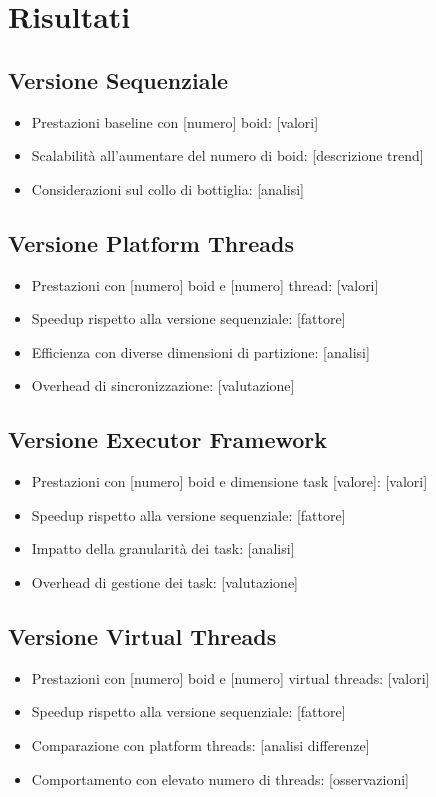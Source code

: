 \documentclass[a4paper,12pt]{report}
\begin{document}
\section{Risultati}

\subsection{Versione Sequenziale}
\begin{itemize}
    \item Prestazioni baseline con [numero] boid: [valori]
    \item Scalabilità all'aumentare del numero di boid: [descrizione trend]
    \item Considerazioni sul collo di bottiglia: [analisi]
\end{itemize}

\subsection{Versione Platform Threads}
\begin{itemize}
    \item Prestazioni con [numero] boid e [numero] thread: [valori]
    \item Speedup rispetto alla versione sequenziale: [fattore]
    \item Efficienza con diverse dimensioni di partizione: [analisi]
    \item Overhead di sincronizzazione: [valutazione]
\end{itemize}

\subsection{Versione Executor Framework}
\begin{itemize}
    \item Prestazioni con [numero] boid e dimensione task [valore]: [valori]
    \item Speedup rispetto alla versione sequenziale: [fattore]
    \item Impatto della granularità dei task: [analisi]
    \item Overhead di gestione dei task: [valutazione]
\end{itemize}

\subsection{Versione Virtual Threads}
\begin{itemize}
    \item Prestazioni con [numero] boid e [numero] virtual threads: [valori]
    \item Speedup rispetto alla versione sequenziale: [fattore]
    \item Comparazione con platform threads: [analisi differenze]
    \item Comportamento con elevato numero di threads: [osservazioni]
\end{itemize}
\end{document}
